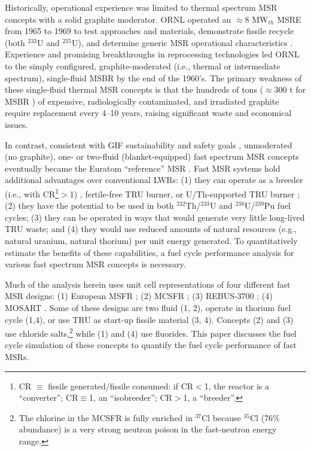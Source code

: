\documentclass[letterpaper]{mandc2019}
\begin{document}
Historically, operational experience was limited to thermal spectrum \gls{MSR} concepts with a solid graphite moderator.  \gls{ORNL} operated an $\approx$8 MW$_{th}$ \gls{MSRE} from 1965 to 1969 to test approaches and materials, demonstrate fissile recycle (both $^{233}$U and $^{235}$U), and determine generic \gls{MSR} operational characteristics \cite{macpherson_molten_1985}. Experience and promising breakthroughs in reprocessing technologies \cite{whatley_engineering_1970} led \gls{ORNL} to the simply configured, graphite-moderated (i.e., thermal or intermediate spectrum), single-fluid \gls{MSBR} by the end of the 1960's. The primary weakness of these single-fluid thermal \gls{MSR} concepts is that the hundreds of tons ($\approx$300 t for \gls{MSBR} \cite{robertson_conceptual_1971}) of expensive, radiologically contaminated, and irradiated graphite require replacement every 4--10 years, raising significant waste and economical issues.

In contrast, consistent with \gls{GIF} sustainability and safety goals \cite{gif_generation_2015}, unmoderated (no graphite), one- or two-fluid (blanket-equipped) fast spectrum \gls{MSR} concepts eventually became the Euratom ``reference'' \gls{MSR} \cite{euratom_final_2015}. Fast \gls{MSR} systems hold additional advantages over conventional \glspl{LWR}:
(1) they can operate as a breeder (i.e., with \gls{CR}\footnote{\gls{CR} $\equiv$ fissile generated/fissile consumed: if CR$<$1, the reactor is a ``converter''; CR$\equiv$1, an ``isobreeder''; CR$>$1, a ``breeder''.}$>$1) \cite{euratom_final_2015, simmons_assessment_1974, mourogov_potentialities_2006-1}, fertile-free \gls{TRU} burner, or U/Th-supported \gls{TRU} burner \cite{ignatiev_progress_2007};
(2) they have the potential to be used in both $^{232}$Th/$^{233}$U and $^{238}$U/$^{239}$Pu fuel cycles;
(3) they can be operated in ways that would generate very little long-lived \gls{TRU} waste; and
(4) they would use reduced amounts of natural resources (e.g., natural uranium, natural thorium) per unit energy generated. To quantitatively estimate the benefits of these capabilities, a fuel cycle performance analysis for various fast spectrum \gls{MSR} concepts is necessary.

Much of the analysis herein uses unit cell representations of four different fast \gls{MSR} designs:
(1) European \gls{MSFR} \cite{euratom_final_2015};
(2) \gls{MCSFR} \cite{simmons_assessment_1974};
(3) REBUS-3700 \cite{mourogov_potentialities_2006-1};
(4) \gls{MOSART} \cite{ignatiev_progress_2007}.
Some of these designs are two fluid (1, 2), operate in thorium fuel cycle (1,4), or use \gls{TRU} as start-up fissile material (3, 4). Concepts (2) and (3) use chloride salts,\footnote{The chlorine in the \gls{MCSFR} is fully enriched in $^{37}$Cl because $^{35}$Cl (76\% abundance) is a very strong neutron poison in the fast-neutron energy range.} while (1) and (4) use fluorides. This paper discusses the fuel cycle simulation of these concepts to quantify the fuel cycle performance of fast \glspl{MSR}.
\end{document}
